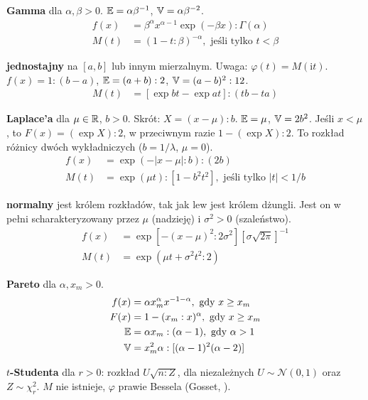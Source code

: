 \begin{multicols*}{2}
\begin{enumx}
	\item \textbf{Gamma} dla $\alpha, \beta > 0$.
	$\mathbb{E} = \alpha \beta^{-1}$, $\mathbb{V} = \alpha \beta^{-2}$.
	\begin{align*}
		f(x) & = \beta^{\alpha} x^{\alpha - 1} \exp(- \beta x): \Gamma(\alpha) \\
		M(t) & = (1 - t : \beta)^{-\alpha}, \mbox{ jeśli tylko } t < \beta
	\end{align*}

	\item \textbf{jednostajny} na $[a,b]$ lub innym mierzalnym.
	Uwaga: $\varphi(t) = M(\textrm{i}t)$.
	$f(x) = 1 : (b-a)$, $\mathbb{E} = (a+b) : 2$, $\mathbb{V} = (a-b)^2 : 12$.
	\begin{align*}
		M(t) & = [\exp bt - \exp at] : (tb - ta)
	\end{align*}
	\item \textbf{Laplace'a} dla $\mu \in \mathbb{R}$, $b > 0$.
	Skrót: $X = (x - \mu) : b$.
	$\mathbb{E} = \mu$, $\mathbb{V} = 2b^2$.
	Jeśli $x < \mu$, to $F(x) = (\exp X) : 2$, w przeciwnym razie $1 - (\exp X) : 2$.
	To rozkład różnicy dwóch wykładniczych ($b = 1 / \lambda$, $\mu = 0$).
	\begin{align*}
		f(x) & = \exp (- |x-\mu| : b) : (2b) \\
		M(t) & = \exp (\mu t) : [1 - b^2 t^2], \mbox{ jeśli tylko } |t| < 1/b
	\end{align*}
	\item \textbf{normalny} jest królem rozkładów, tak jak lew jest królem dżungli.
	Jest on w pełni scharakteryzowany przez $\mu$ (nadzieję) i $\sigma^2 > 0$ (szaleństwo).
	\begin{align*}
		f(x) & = \exp[- (x- \mu)^2 : 2 \sigma^2] [\sigma \sqrt{2\pi}]^{-1}\\
		M(t) & = \exp (\mu t + \sigma^2 t^2 : 2)
	\end{align*}
	\item \textbf{Pareto} dla $\alpha, x_m > 0$.
	\begin{align*}
		f(x) & = \alpha x_m^\alpha x^{-1 - \alpha}, \mbox{ gdy } x \ge x_m\\
		F(x) & = 1 - (x_m : x)^\alpha, \mbox{ gdy } x \ge x_m \\
		\mathbb{E} & = \alpha x_m : (\alpha - 1), \mbox{ gdy } \alpha > 1\\
		\mathbb{V} & = x_m^2 \alpha :[(\alpha - 1)^2 (\alpha - 2)]
	\end{align*}
	\item \textbf{$t$-Studenta} dla $r > 0$: rozkład $U \sqrt{n : Z}$, dla niezależnych $U \sim \mathcal N(0, 1)$ oraz $Z \sim \chi^2_r$. $M$ nie istnieje, $\varphi$ prawie Bessela (Gosset, ).

\end{enumx}
\end{multicols*}
